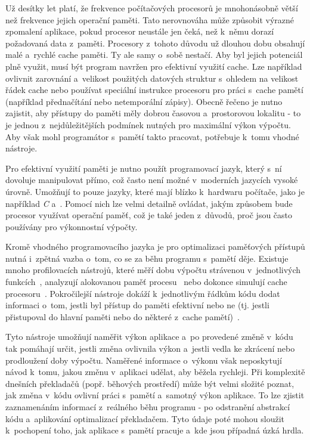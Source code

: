Už desítky let platí, že frekvence počítačových procesorů je mnohonásobně větší než frekvence jejich operační paměti. Tato nerovnováha může způsobit výrazné zpomalení aplikace, pokud procesor neustále jen čeká, než k~němu dorazí požadovaná data z~paměti. Procesory z~tohoto důvodu už dlouhou dobu obsahují malé a~rychlé cache paměti. Ty ale samy o~sobě nestačí. Aby byl jejich potenciál plně využit, musí být program navržen pro efektivní využití cache. Lze například ovlivnit zarovnání a~velikost použitých datových struktur s~ohledem na velikost řádek cache nebo používat speciální instrukce procesoru pro práci s~cache pamětí (například přednačítání nebo netemporální zápisy). Obecně řečeno je nutno zajistit, aby přístupy do paměti měly dobrou časovou a~prostorovou lokalitu - to je jednou z~nejdůležitějších podmínek nutných pro maximální výkon výpočtu. Aby však mohl programátor s~pamětí takto pracovat, potřebuje k~tomu vhodné nástroje.

Pro efektivní využití paměti je nutno použít programovací jazyk, který s~ní dovoluje manipulovat přímo, což často není možné v~moderních jazycích vysoké úrovně. Umožňují to pouze jazyky, které mají blízko k~hardwaru počítače, jako je například \emph{C} a~\emph{\CPP}. Pomocí nich lze velmi detailně ovládat, jakým způsobem bude procesor využívat operační paměť, což je také jeden z~důvodů, proč jsou často používány pro výkonnostní výpočty.

Kromě vhodného programovacího jazyka je pro optimalizaci paměťových přístupů nutná i~zpětná vazba o~tom, co se za běhu programu s~pamětí děje. Existuje mnoho profilovacích nástrojů, které měří dobu výpočtu strávenou v~jednotlivých funkcích~\cite{gprof}, analyzují alokovanou paměť procesu~\cite{massif} nebo dokonce simulují cache procesoru~\cite{nethercotephd}. Pokročilejší nástroje dokáží k~jednotlivým řádkům kódu dodat informaci o~tom, jestli byl přístup do paměti efektivní nebo ne (tj. jestli přistupoval do hlavní paměti nebo do některé z~cache pamětí)~\cite{vtune}.

Tyto nástroje umožňují naměřit výkon aplikace a~po provedené změně v~kódu tak pomáhají určit, jestli změna ovlivnila výkon a~jestli vedla ke zkrácení nebo prodloužení doby výpočtu. Naměřené informace o~výkonu však neposkytují návod k~tomu, jakou změnu v~aplikaci udělat, aby běžela rychleji. Při komplexitě dnešních překladačů (popř. běhových prostředí) může být velmi složité poznat, jak změna v~kódu ovlivní práci s~pamětí a~samotný výkon aplikace. To lze zjistit zaznamenáním informací z~reálného běhu programu - po odstranění abstrakcí kódu a~aplikování optimalizací překladačem. Tyto údaje poté mohou sloužit k~pochopení toho, jak aplikace s~pamětí pracuje a~kde jsou případná úzká hrdla.

